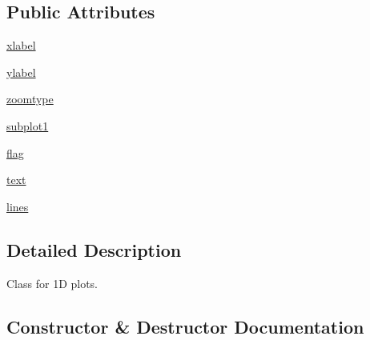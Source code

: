 \subsection*{Public Attributes}
\begin{DoxyCompactItemize}
\item 
\hyperlink{class_uni_dec_1_1unidec__modules_1_1plot1d_1_1_plot1d_ab6ee7aa1f3681f697cbe89a77f69418b}{xlabel}
\item 
\hyperlink{class_uni_dec_1_1unidec__modules_1_1plot1d_1_1_plot1d_afe92dd02632dfc752ac2e3792ea9b865}{ylabel}
\item 
\hyperlink{class_uni_dec_1_1unidec__modules_1_1plot1d_1_1_plot1d_aa4c2844a1d7accc0060951a392b46ab7}{zoomtype}
\item 
\hyperlink{class_uni_dec_1_1unidec__modules_1_1plot1d_1_1_plot1d_af07117886c234567f969ce25b5394a60}{subplot1}
\item 
\hyperlink{class_uni_dec_1_1unidec__modules_1_1plot1d_1_1_plot1d_a5ef31a1d834371f3689dbbae4efcc338}{flag}
\item 
\hyperlink{class_uni_dec_1_1unidec__modules_1_1plot1d_1_1_plot1d_a9c86efb0314ccf9007e28bba28eb530b}{text}
\item 
\hyperlink{class_uni_dec_1_1unidec__modules_1_1plot1d_1_1_plot1d_a289c4433eeeb7d34a88e9a13e5d6eddd}{lines}
\end{DoxyCompactItemize}


\subsection{Detailed Description}
\begin{DoxyVerb}Class for 1D plots.
\end{DoxyVerb}
 

\subsection{Constructor \& Destructor Documentation}
\hypertarget{class_uni_dec_1_1unidec__modules_1_1plot1d_1_1_plot1d_a7a1a69f6af55c446f938af82b9fb96c8}{}
